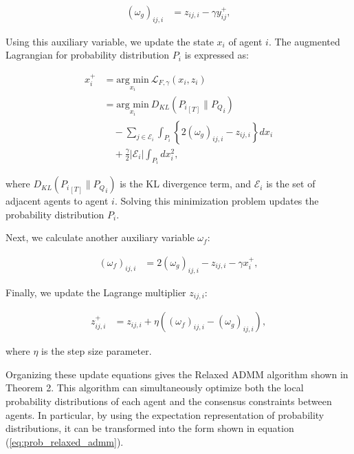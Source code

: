 \documentclass[a4paper,fleqn,10pt,twocolumn]{SICE_ISCS}
\begin{document}
\begin{equation}
\begin{aligned}
(\omega_g)_{ij,i} &= z_{ij,i} - \gamma y^+_{ij},
\end{aligned}
\end{equation}

Using this auxiliary variable, we update the state $x_i$ of agent $i$. The augmented Lagrangian for probability distribution $P_i$ is expressed as:

\begin{equation}
\begin{aligned}
x^+_i&= \underset{x_i}{\text{arg min}}\: {\mathcal{L}}_{F,\gamma}(x_i, z_i)\\
&=  \underset{x_i}{\text{arg min}}\: D_{KL} ({P_i}_{[T]}\|{P_Q}_i) \\
& \quad - \sum_{j\in {\mathcal{E}}_i} \int_{P_i} \left\{2(\omega_g)_{ij,i} - z_{ij,i}\right\} dx_i\\
& \quad + \frac{\gamma}{2}|{\mathcal{E}}_i|\int_{P_i} dx_i^2,
\end{aligned}
\end{equation}

where $D_{KL} ({P_i}_{[T]}\|{P_Q}_i)$ is the KL divergence term, and ${\mathcal{E}}_i$ is the set of adjacent agents to agent $i$. Solving this minimization problem updates the probability distribution $P_i$.

Next, we calculate another auxiliary variable $\omega_f$:

\begin{equation}
\begin{aligned}
(\omega_f)_{ij,i} &= 2(\omega_g)_{ij,i} - z_{ij,i} - \gamma x^+_{i},
\end{aligned}
\end{equation}

Finally, we update the Lagrange multiplier $z_{ij,i}$:

\begin{equation}
\begin{aligned}
z^+_{ij,i}&=z_{ij,i}+\eta((\omega_f)_{ij,i}-(\omega_g)_{ij,i}),
\end{aligned}
\end{equation}

where $\eta$ is the step size parameter.

Organizing these update equations gives the Relaxed ADMM algorithm shown in Theorem 2. This algorithm can simultaneously optimize both the local probability distributions of each agent and the consensus constraints between agents. In particular, by using the expectation representation of probability distributions, it can be transformed into the form shown in equation (\ref{eq:prob_relaxed_admm}).
\end{document}
